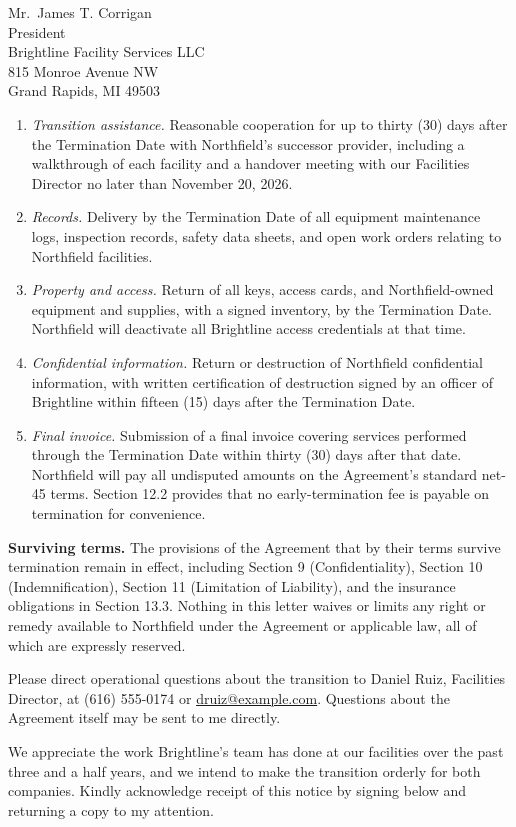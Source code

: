 \documentclass[11pt]{letter}
\begin{document}
\begin{letter}{Mr.\ James T. Corrigan\\
President\\
Brightline Facility Services LLC\\
815 Monroe Avenue NW\\
Grand Rapids, MI 49503}
\begin{enumerate}
  \item \emph{Transition assistance.} Reasonable cooperation for up to thirty (30) days after the Termination Date with Northfield's successor provider, including a walkthrough of each facility and a handover meeting with our Facilities Director no later than November 20, 2026.
  \item \emph{Records.} Delivery by the Termination Date of all equipment maintenance logs, inspection records, safety data sheets, and open work orders relating to Northfield facilities.
  \item \emph{Property and access.} Return of all keys, access cards, and Northfield-owned equipment and supplies, with a signed inventory, by the Termination Date. Northfield will deactivate all Brightline access credentials at that time.
  \item \emph{Confidential information.} Return or destruction of Northfield confidential information, with written certification of destruction signed by an officer of Brightline within fifteen (15) days after the Termination Date.
  \item \emph{Final invoice.} Submission of a final invoice covering services performed through the Termination Date within thirty (30) days after that date. Northfield will pay all undisputed amounts on the Agreement's standard net-45 terms. Section 12.2 provides that no early-termination fee is payable on termination for convenience.
\end{enumerate}

\textbf{Surviving terms.} The provisions of the Agreement that by their terms survive termination remain in effect, including Section 9 (Confidentiality), Section 10 (Indemnification), Section 11 (Limitation of Liability), and the insurance obligations in Section 13.3. Nothing in this letter waives or limits any right or remedy available to Northfield under the Agreement or applicable law, all of which are expressly reserved.

Please direct operational questions about the transition to Daniel Ruiz, Facilities Director, at (616) 555-0174 or \href{mailto:druiz@example.com}{druiz@example.com}. Questions about the Agreement itself may be sent to me directly.

We appreciate the work Brightline's team has done at our facilities over the past three and a half years, and we intend to make the transition orderly for both companies. Kindly acknowledge receipt of this notice by signing below and returning a copy to my attention.


\end{letter}
\end{document}
